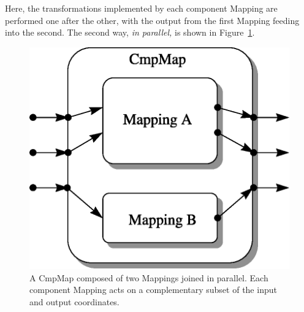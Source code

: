 \documentclass[twoside,11pt]{article}
\newenvironment{latexonly}{}{}
\begin{document}
\begin{latexonly}
   Here, the transformations implemented by each component Mapping are
   performed one after the other, with the output from the first Mapping
   feeding into the second.  The second way, {\em{in parallel,}} is shown in
   Figure~\ref{fig:parallelcmpmap}.
   \begin{figure}
   \begin{center}
   \includegraphics[scale=0.75]{sun211_figures/parallel.eps}
   \caption{A CmpMap composed of two Mappings joined in parallel. Each
   component Mapping acts on a complementary subset of the input and
   output coordinates.}
   \label{fig:parallelcmpmap}
   \end{center}
   \end{figure}
\end{latexonly}
\end{document}
